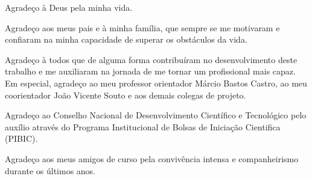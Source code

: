 \begin{agradecimentos}
  Agradeço à Deus pela minha vida.
  
  Agradeço aos meus pais e à minha família, que sempre se me motivaram e confiaram na minha capacidade de superar os obstáculos da vida.
  
  Agradeço à todos que de alguma forma contribuíram no desenvolvimento deste trabalho e me auxiliaram na jornada de me tornar um profissional mais capaz. Em especial, agradeço ao meu professor orientador Márcio Bastos Castro, ao meu coorientador João Vicente Souto e aos demais colegas de projeto. 
  
  Agradeço ao Conselho Nacional de Desenvolvimento Científico e Tecnológico pelo auxílio através do Programa Institucional de Bolsas de Iniciação Cientifica (PIBIC).
  
  Agradeço aos meus amigos de curso pela convivência intensa e companheirismo durante os últimos anos.
  
\end{agradecimentos}
